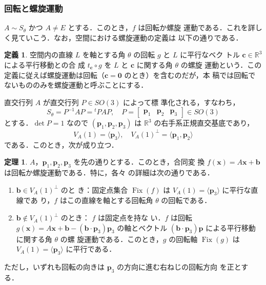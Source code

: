 \documentclass[11pt, uplatex, dvipdfmx, titlepage]{jsarticle}
\DeclareMathOperator{\Fix}{Fix}
\theoremstyle{definition}
\newtheorem{theorem}{定理}[section]
\newtheorem*{definition}{定義}
\begin{document}
\subsubsection{回転と螺旋運動}\label{sec:RotSpiral3}

$A \sim S_{\theta}$ かつ $A \neq E$ とする．このとき，$f$ は回転か螺旋
運動である．これを詳しく見ていこう．なお，空間における螺旋運動の定義は
以下の通りである．

\begin{definition}
  空間内の直線 $L$ を軸とする角 $\theta$ の回転 $g$ と $L$ に平行なベク
  トル $\bm{c} \in \mathbb{R}^3$ による平行移動との合
  成 $t_{\bm{c}}\circ g$ を $L$ と $\bm{c}$ に関する角 $\theta$ の螺旋
  運動という．この定義に従えば螺旋運動は回転（$\bm{c}=\bm{0}$ のとき）を含むのだが，本
  稿では回転でないもののみを螺旋運動と呼ぶことにする．
\end{definition}


直交行列 $A$ が直交行列 $P \in SO(3)$ によって標
準化される，すなわち，
\[
  S_{\theta} = P^{-1}AP = {}^{t}P A P, \quad P=\left[
    \begin{array}{ccc}
      \bm{p}_1 & \bm{p}_2 & \bm{p}_3
    \end{array}
  \right] \in SO(3)
\]
とする．$\det P=1$ なので $\left( \bm{p}_1, \bm{p}_2, \bm{p}_3\right)$
は $\mathbb{R}^3$ の右手系正規直交基底であり，
\[
  V_A(1)= \langle \bm{p}_3 \rangle, \quad V_A(1)^{\perp} = \langle \bm{p}_1, \bm{p}_2 \rangle
\]
である．このとき，次が成り立つ．

\begin{theorem}\label{thm:RotOrSpiral3}
  $A，\bm{p}_1, \bm{p}_2, \bm{p}_3$ を先の通りとする．このとき，合同変
  換 $f(\bm{x}) = A\bm{x} + \bm{b}$ は回転か螺旋運動である．特に，各々
  の詳細は次の通りである．
  \begin{enumerate}[(1)]
  \item $\bm{b} \in V_A(1)^{\perp}$ のと
    き：固定点集合 $\Fix(f)$ は $V_A(1)=\langle \bm{p}_3\rangle$ に平行な直線であ
    り，$f$ はこの直線を軸とする回転角 $\theta$ の回転である．
    
  \item $\bm{b} \not\in V_A(1)^{\perp}$ のとき： $f$ は固定点を持な
    い．$f$ は回転 $g(\bm{x}) = A\bm{x} +
    \bm{b}-(\bm{b} \cdot \bm{p}_3)\bm{p}_3$ の軸とベクトル
    $(\bm{b}\cdot \bm{p}_3)\bm{p}$ による平行移動に関する角 $\theta$ の螺
    旋運動である．このとき，$g$ の回転軸 $\Fix(g)$ は $V_A(1)=\langle
    \bm{p}_3 \rangle$ に平行である．
  \end{enumerate}
  ただし，いずれも回転の向きは $\bm{p}_3$ の方向に進む右ねじの回転方向
  を正とする．
\end{theorem}
\end{document}
